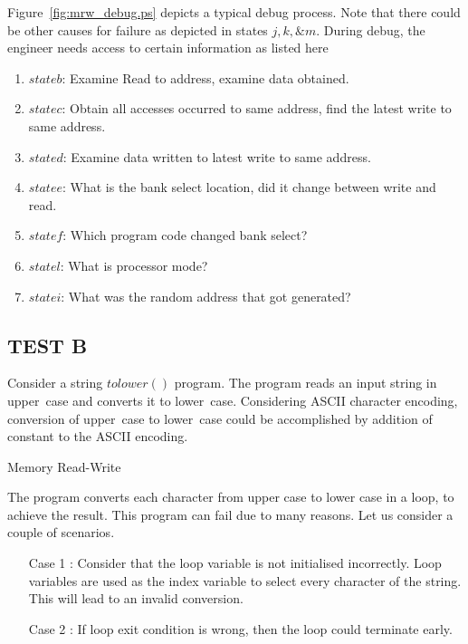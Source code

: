 Figure~\ref{fig:mrw_debug.ps} depicts a typical debug process. Note that there could be other causes for failure as depicted in states $j, k, \& m$. During debug, the engineer needs access to certain information as listed here
\begin{enumerate}
\item $state b$: Examine Read to address, examine data obtained.
\item $state c$: Obtain all accesses occurred to same address, find the latest write to same address.
\item $state d$: Examine data written to latest write to same address.
\item $state e$: What is the bank select location, did it change between write and read.
\item $state f$: Which program code changed bank select?
\item $state l$: What is processor mode?
\item $state i$: What was the random address that got generated?
\end{enumerate}

\subsection {TEST B}
\label{case:testb}
Consider a string $tolower()$ program. The program reads an input string in upper~case and converts it to lower~case. Considering ASCII character encoding, conversion of upper~case to lower~case could be accomplished by addition of constant to the ASCII encoding.



\vspace{1.5cm}
\IncMargin{1em}
\begin{algorithm}[h]
\DontPrintSemicolon
{}

\BlankLine
 \;

\caption{Memory Read-Write}
\end{algorithm}\DecMargin{1em}

\vspace{1.5cm}

The program converts each character from upper case to lower case in a loop, to achieve the result. This program can fail due to many reasons. Let us consider a couple of scenarios.

\begin{itemize}

\item [Case 1]: Consider that the loop variable is not initialised incorrectly. Loop variables are used as the index variable to select every character of the string. This will lead to an invalid conversion. \label{algo:tolow:case1}

\item [Case 2]: If loop exit condition is wrong, then the loop could terminate early. \label{algo:tolow:case2}
\end{itemize}

